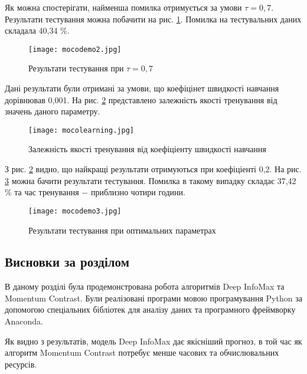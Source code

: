 Як можна спостерігати, найменша помилка отримується за умови $\tau = 0,7$. Результати тестування можна побачити на рис. \ref{fig:mocodemo2}. Помилка на тестувальних даних складала 40,34 \%.


\begin{figure}[h]
  \texttt{[image: mocodemo2.jpg]}
  \caption{Результати тестування при $\tau = 0,7$}
  \label{fig:mocodemo2}
\end{figure}

Дані результати були отримані за умови, що коефіцінет швидкості навчання дорівнював 0,001. На рис. \ref{fig:mocolearning} представлено залежність якості тренування від значень даного параметру.

\begin{figure}[h]
  \texttt{[image: mocolearning.jpg]}
  \caption{Залежність якості тренування від коефіціенту швидкості навчання}
  \label{fig:mocolearning}
\end{figure}

\newpage

З рис. \ref{fig:mocolearning} видно, що найкращі результати отримуються при коефіціенті 0,2. На рис. \ref{fig:mocodemo3} можна бачити результати тестування. Помилка в такому випадку складає 37,42 \% та час тренування $-$ приблизно чотири години.


\begin{figure}[h!]
  \texttt{[image: mocodemo3.jpg]}
  \caption{Результати тестування при оптимальних параметрах}
  \label{fig:mocodemo3}
\end{figure}

\newpage

\subsection{Висновки за розділом}

В даному розділі була продемонстрована робота алгоритмів Deep InfoMax та Momentum Contrast. Були реалізовані програми мовою програмування Python за допомогою спеціальних бібліотек для аналізу даних та програмного фреймворку Anaconda. 

Як видно з результатів, модель Deep InfoMax дає якісніший прогноз, в той час як алгоритм Momentum Contrast потребує менше часових та обчислювальних ресурсів.
